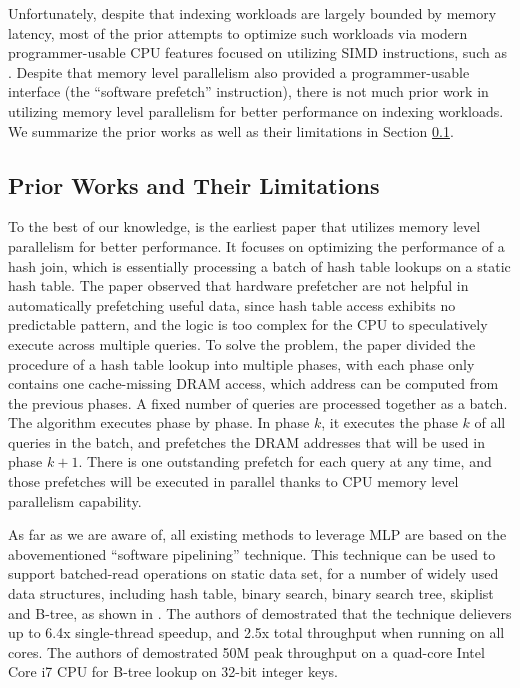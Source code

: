 \documentclass[11pt, usletter]{article}
\begin{document}
Unfortunately, despite that indexing workloads are largely bounded by memory latency, 
most of the prior attempts to optimize such workloads via modern programmer-usable CPU features 
focused on utilizing SIMD instructions, such as \cite{fast_sigmod10, arttrie_icde13, masstree, hot_sigmod18}.
Despite that memory level parallelism also provided a programmer-usable interface (the ``software prefetch'' instruction), 
there is not much prior work in utilizing memory level parallelism for better performance on indexing workloads. 
We summarize the prior works as well as their limitations in Section \ref{relwork}.

\subsection{Prior Works and Their Limitations} \label{relwork}


To the best of our knowledge,
\cite{hashjoin_icde04} is the earliest paper that utilizes memory level parallelism for better performance. 
It focuses on optimizing the performance of a hash join, which is essentially processing a batch of hash table lookups on a static hash table. 
The paper observed that hardware prefetcher are not helpful in automatically prefetching useful data, 
since hash table access exhibits no predictable pattern, 
and the logic is too complex for the CPU to speculatively execute across multiple queries.
To solve the problem, the paper divided the procedure of a hash table lookup into multiple phases, 
with each phase only contains one cache-missing DRAM access, which address can be computed from the previous phases.
A fixed number of queries are processed together as a batch. 
The algorithm executes phase by phase. In phase $k$, it executes the phase $k$ of all queries in the batch, 
and prefetches the DRAM addresses that will be used in phase $k+1$.
There is one outstanding prefetch for each query at any time, 
and those prefetches will be executed in parallel thanks to CPU memory level parallelism capability.

As far as we are aware of, all existing methods to leverage MLP are based on the abovementioned ``software pipelining'' technique.
This technique can be used to support batched-read operations on static data set, for a number of widely used data structures, 
including hash table, binary search, binary search tree, skiplist and B-tree, as shown in \cite{cimple_pact18, fast_sigmod10}.
The authors of \cite{cimple_pact18} demostrated that the technique delievers up to 6.4x single-thread speedup, 
and 2.5x total throughput when running on all cores. 
The authors of \cite{fast_sigmod10} demostrated 50M peak throughput 
on a quad-core Intel Core i7 CPU for B-tree lookup on 32-bit integer keys.
\end{document}
